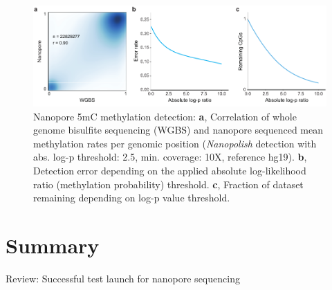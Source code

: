 \begin{figure}[h]
    \centering
    \includegraphics[width=1.0\textwidth]{figures/state_of_art/methylation.pdf}
    \captionsetup{format=plain}
    \caption[Nanopore methylation detection]{Nanopore 5mC methylation detection: \textbf{a}, Correlation of whole genome bisulfite sequencing (WGBS) and nanopore sequenced mean methylation rates per genomic position (\textit{Nanopolish} detection with abs. log-p threshold: 2.5, min. coverage: 10X, reference hg19). \textbf{b}, Detection error depending on the applied absolute log-likelihood ratio (methylation probability) threshold. \textbf{c}, Fraction of dataset remaining depending on log-p value threshold.}
    \label{fig:state_of_art:methylation}
\end{figure}




\section{Summary}
\label{sec:stat_of_art:summary}


Review: Successful test launch for nanopore sequencing \cite{Loman2015a}






